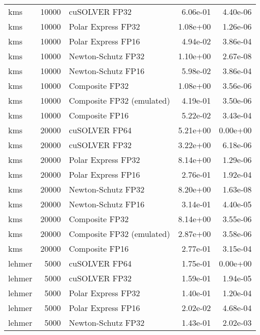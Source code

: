 \begin{table}
\begin{tabular}{lrlrr}
      kms & 10000 &             cuSOLVER FP32 &  6.06e-01 &        4.40e-06 \\
      kms & 10000 &        Polar Express FP32 &  1.08e+00 &        1.26e-06 \\
      kms & 10000 &        Polar Express FP16 &  4.94e-02 &        3.86e-04 \\
      kms & 10000 &        Newton-Schutz FP32 &  1.10e+00 &        2.67e-08 \\
      kms & 10000 &        Newton-Schutz FP16 &  5.98e-02 &        3.86e-04 \\
      kms & 10000 &            Composite FP32 &  1.08e+00 &        3.56e-06 \\
      kms & 10000 & Composite FP32 (emulated) &  4.19e-01 &        3.50e-06 \\
      kms & 10000 &            Composite FP16 &  5.22e-02 &        3.43e-04 \\
      kms & 20000 &             cuSOLVER FP64 &  5.21e+00 &        0.00e+00 \\
      kms & 20000 &             cuSOLVER FP32 &  3.22e+00 &        6.18e-06 \\
      kms & 20000 &        Polar Express FP32 &  8.14e+00 &        1.29e-06 \\
      kms & 20000 &        Polar Express FP16 &  2.76e-01 &        1.92e-04 \\
      kms & 20000 &        Newton-Schutz FP32 &  8.20e+00 &        1.63e-08 \\
      kms & 20000 &        Newton-Schutz FP16 &  3.14e-01 &        4.40e-05 \\
      kms & 20000 &            Composite FP32 &  8.14e+00 &        3.55e-06 \\
      kms & 20000 & Composite FP32 (emulated) &  2.87e+00 &        3.58e-06 \\
      kms & 20000 &            Composite FP16 &  2.77e-01 &        3.15e-04 \\
   lehmer &  5000 &             cuSOLVER FP64 &  1.75e-01 &        0.00e+00 \\
   lehmer &  5000 &             cuSOLVER FP32 &  1.59e-01 &        1.94e-05 \\
   lehmer &  5000 &        Polar Express FP32 &  1.40e-01 &        1.20e-04 \\
   lehmer &  5000 &        Polar Express FP16 &  2.02e-02 &        4.68e-04 \\
   lehmer &  5000 &        Newton-Schutz FP32 &  1.43e-01 &        2.02e-03 \\

\end{tabular}
\end{table}
